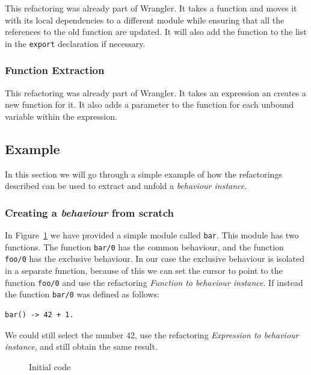 This refactoring was already part of Wrangler. It takes a function
and moves it with its local dependencies to a different module while
ensuring that all the references to the old function are updated.
It will also add the function to the list in the \texttt{export} declaration
if necessary.


\subsubsection{Function Extraction\label{sub:fun_extraction}}

This refactoring was already part of Wrangler. It takes an expression
an creates a new function for it. It also adds a parameter to the
function for each unbound variable within the expression.


\subsection{Example}

In this section we will go through a simple example of how the refactorings
described can be used to extract and unfold a \emph{behaviour instance}.


\subsubsection{Creating a \emph{behaviour} from scratch}

In Figure~\ref{fig:initial_code} we have provided a simple module
called \texttt{bar}. This module has two functions. The function \texttt{bar/0}
has the common behaviour, and the function \texttt{foo/0} has the
exclusive behaviour. In our case the exclusive behaviour is isolated
in a separate function, because of this we can set the cursor to point
to the function \texttt{foo/0} and use the refactoring \emph{Function
to behaviour instance}. If instead the function \texttt{bar/0} was
defined as follows:

\begin{verbatim}
bar() -> 42 + 1.
\end{verbatim}

We could still select the number 42, use the refactoring \emph{Expression
to behaviour instance}, and still obtain the same result.

\begin{figure}


\caption{Initial code\label{fig:initial_code}}
\end{figure}



